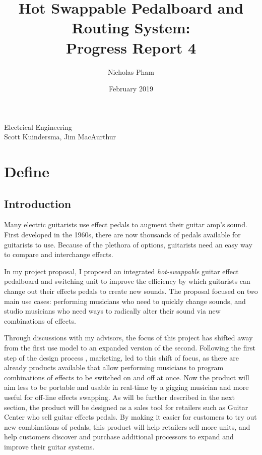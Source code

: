 \documentclass{article}
\title{Hot Swappable Pedalboard and Routing System:\\Progress Report 4}
\author{Nicholas Pham}
\date{February 2019}
\begin{document}
\maketitle
\begin{center}
    Electrical Engineering \\
    Scott Kuindersma, Jim MacAurthur
\end{center}

\newpage
\glsaddall
\printglossaries
\newpage


\color{gray}
\section{Define}
	\subsection{Introduction}
	
	Many electric guitarists use effect pedals to augment their guitar amp's sound.  First developed in the 1960s, there are now thousands of pedals available for guitarists to use.  Because of the plethora of options, guitarists need an easy way to compare and interchange effects.

	In my project proposal, I proposed an integrated \emph{hot-swappable} guitar effect pedalboard and switching unit to improve the efficiency by which guitarists can change out their effects pedals to create new sounds.  The proposal focused on two main use cases: performing musicians who need to quickly change sounds, and studio musicians who need ways to radically alter their sound via new combinations of effects.

	Through discussions with my advisors, the focus of this project has shifted away from the first use model to an expanded version of the second.  Following the first step of the design process \cite{ES100Lec3}, marketing, led to this shift of focus, as there are already products available that allow performing musicians to program combinations of effects to be switched on and off at once.  Now the product will aim less to be portable and usable in real-time by a gigging musician and more useful for off-line effects swapping.  As will be further described in the next section, the product will be designed as a sales tool for retailers such as Guitar Center who sell guitar effects pedals.  By making it easier for customers to try out new combinations of pedals, this product will help retailers sell more units, and help customers discover and purchase additional processors to expand and improve their guitar systems.
	
\end{document}
